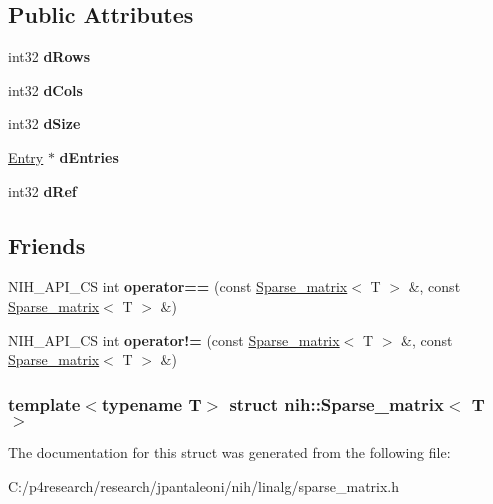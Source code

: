 \subsection*{\-Public \-Attributes}
\begin{DoxyCompactItemize}
\item 
\hypertarget{structnih_1_1_sparse__matrix_acf8b6ee733e537017a67a2b16fde7bb4}{
int32 {\bfseries d\-Rows}}
\label{structnih_1_1_sparse__matrix_acf8b6ee733e537017a67a2b16fde7bb4}

\item 
\hypertarget{structnih_1_1_sparse__matrix_a8992940bbdf71f634b1903d997364561}{
int32 {\bfseries d\-Cols}}
\label{structnih_1_1_sparse__matrix_a8992940bbdf71f634b1903d997364561}

\item 
\hypertarget{structnih_1_1_sparse__matrix_a5b7bca68a2f05719abc0872628666996}{
int32 {\bfseries d\-Size}}
\label{structnih_1_1_sparse__matrix_a5b7bca68a2f05719abc0872628666996}

\item 
\hypertarget{structnih_1_1_sparse__matrix_a41252150eaca79bcd22e4d88ae8a696c}{
\hyperlink{structnih_1_1_sparse__matrix__entry}{\-Entry} $\ast$ {\bfseries d\-Entries}}
\label{structnih_1_1_sparse__matrix_a41252150eaca79bcd22e4d88ae8a696c}

\item 
\hypertarget{structnih_1_1_sparse__matrix_a562712ea777668659a10162247356b0f}{
int32 {\bfseries d\-Ref}}
\label{structnih_1_1_sparse__matrix_a562712ea777668659a10162247356b0f}

\end{DoxyCompactItemize}
\subsection*{\-Friends}
\begin{DoxyCompactItemize}
\item 
\hypertarget{structnih_1_1_sparse__matrix_af5397d90bf7019ac0de74af23156e628}{
\-N\-I\-H\-\_\-\-A\-P\-I\-\_\-\-C\-S int {\bfseries operator==} (const \hyperlink{structnih_1_1_sparse__matrix}{\-Sparse\-\_\-matrix}$<$ \-T $>$ \&, const \hyperlink{structnih_1_1_sparse__matrix}{\-Sparse\-\_\-matrix}$<$ \-T $>$ \&)}
\label{structnih_1_1_sparse__matrix_af5397d90bf7019ac0de74af23156e628}

\item 
\hypertarget{structnih_1_1_sparse__matrix_af0a54b9f876f340e435b4ac13b3dc9ac}{
\-N\-I\-H\-\_\-\-A\-P\-I\-\_\-\-C\-S int {\bfseries operator!=} (const \hyperlink{structnih_1_1_sparse__matrix}{\-Sparse\-\_\-matrix}$<$ \-T $>$ \&, const \hyperlink{structnih_1_1_sparse__matrix}{\-Sparse\-\_\-matrix}$<$ \-T $>$ \&)}
\label{structnih_1_1_sparse__matrix_af0a54b9f876f340e435b4ac13b3dc9ac}

\end{DoxyCompactItemize}
\subsubsection*{template$<$typename \-T$>$ struct nih\-::\-Sparse\-\_\-matrix$<$ T $>$}



\-The documentation for this struct was generated from the following file\-:\begin{DoxyCompactItemize}
\item 
\-C\-:/p4research/research/jpantaleoni/nih/linalg/sparse\-\_\-matrix.\-h\end{DoxyCompactItemize}
